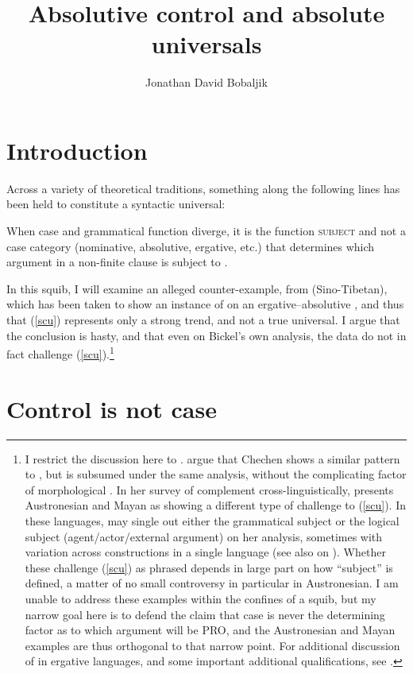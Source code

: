 \documentclass[output=paper]{langsci/langscibook}
\author{Jonathan David Bobaljik\affiliation{Harvard University}}
\title{Absolutive control and absolute universals}
\begin{document}
\glsresetall

\section{Introduction}

Across a variety of theoretical traditions, something along the following lines
has been held to constitute a syntactic universal:

\ea \label{scu} When case and grammatical function diverge, it is the function
\textsc{subject} and not a case category (nominative, absolutive, ergative, etc.)
that determines which argument in a non-finite clause is subject to .
\z

In this squib, I will examine an alleged counter-example, from 
(Sino-Tibetan), which has been taken \citep{bicknich01,malchukov14} to show an
instance of  on an ergative--absolutive , and thus that
(\ref{scu}) represents only a strong trend, and not a true universal. I argue
that the conclusion is hasty, and that even on Bickel's own analysis, the data
do not in fact challenge (\ref{scu}).\footnote{I restrict the discussion here
    to . \citet{bicknich01} argue that Chechen shows a similar pattern
    to , but is subsumed under the same analysis, without the
    complicating factor of morphological . In her survey of complement
     cross-linguistically, \cite{stiebels07} presents Austronesian and
    Mayan as showing a different type of challenge to (\ref{scu}).  In these
    languages,  may single out either the grammatical subject or the
    logical subject (agent/actor/external argument) on her analysis,  sometimes
    with variation across constructions in a single language (see also
    \citealp{Kroeger:1993,wurmbrand13tag} on ).  Whether these challenge
    (\ref{scu}) as phrased depends in large part on how \enquote{subject} is
    defined, a matter of no small controversy in particular in Austronesian. I
    am unable to address these examples within the confines of a squib, but my
    narrow goal here is to defend the claim that case is never the determining
    factor as to which argument will be PRO, and the Austronesian and Mayan
    examples are thus orthogonal to that narrow point. For additional
discussion of  in ergative languages, and some important additional
qualifications, see \citet[104--109]{polinsky16}.}

\section{Control is not case}
\end{document}
